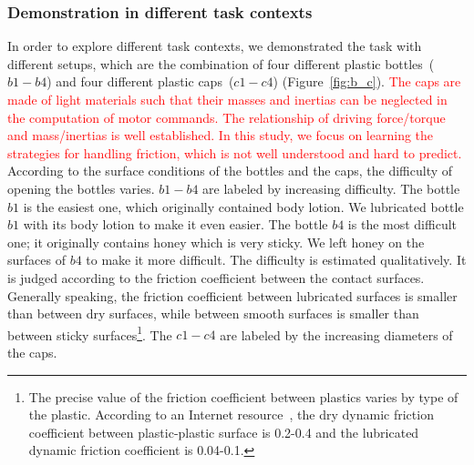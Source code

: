 \subsubsection{Demonstration in different task contexts}
\label{sec:exp_context}
In order to explore
different task contexts, we demonstrated the task with different
setups, which are the combination of four different plastic
bottles~($b1-b4$) and four different plastic caps~($c1-c4$)
(Figure~\ref{fig:b_c}). \textcolor{red}{The caps are made of light materials such that their masses and inertias can be neglected in the computation of motor commands.  The relationship of driving force/torque and mass/inertias is well established. In this study, we focus on learning the strategies for handling friction, which is not well understood and hard to predict.} According to the surface conditions of the
bottles and the caps, the difficulty of opening the bottles
varies. $b1-b4$ are labeled by increasing difficulty. The bottle $b1$
is the easiest one, which originally contained body lotion. We
lubricated bottle $b1$ with its body lotion to make it even easier. The
bottle $b4$ is the most difficult one; it originally contains honey
which is very sticky. We left honey on the surfaces of $b4$ to make
it more difficult. The difficulty is estimated qualitatively. It is
judged according to the friction coefficient between the contact
surfaces. Generally speaking, the friction coefficient between
lubricated surfaces is smaller than between dry surfaces, while
between smooth surfaces is smaller than between sticky
surfaces\footnote{The precise value of the friction coefficient between
  plastics varies by type of the plastic. According to an Internet
  resource~\citep{FOC}, the dry dynamic friction coefficient between
  plastic-plastic surface is 0.2-0.4 and the lubricated dynamic
  friction coefficient is 0.04-0.1.}. The $c1-c4$ are labeled by the increasing diameters of the caps.



